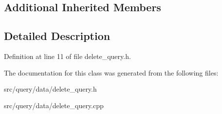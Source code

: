 \subsection*{Additional Inherited Members}


\subsection{Detailed Description}


Definition at line 11 of file delete\+\_\+query.\+h.



The documentation for this class was generated from the following files\+:\begin{DoxyCompactItemize}
\item 
src/query/data/delete\+\_\+query.\+h\item 
src/query/data/delete\+\_\+query.\+cpp\end{DoxyCompactItemize}
